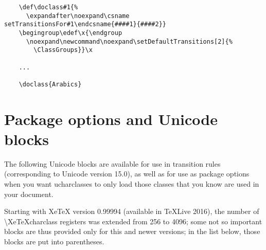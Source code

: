 \documentclass{article}
\begin{document}
    \disableTransitionRules
    \begin{verbatim}
    \def\doclass#1{%
      \expandafter\noexpand\csname setTransitionsFor#1\endcsname{####1}{####2}}
    \begingroup\edef\x{\endgroup
      \noexpand\newcommand\noexpand\setDefaultTransitions[2]{%
        \ClassGroups}}\x

    ...

    \doclass{Arabics}
    \end{verbatim}
    \enableTransitionRules

  \pagebreak

  \section{Package options and Unicode blocks}

    The following Unicode blocks are available for use in transition rules (corresponding to Unicode version 15.0), as well as for use as package options when you want ucharclasses to only load those classes that you know are used in your document.

    Starting with XeTeX version 0.99994 (available in TeXLive 2016), the number of \textbackslash XeTeXcharclass registers was extended from 256 to 4096; some not so important blocks are thus provided only for this and newer versions; in the list below, those blocks are put into parentheses.
\end{document}
